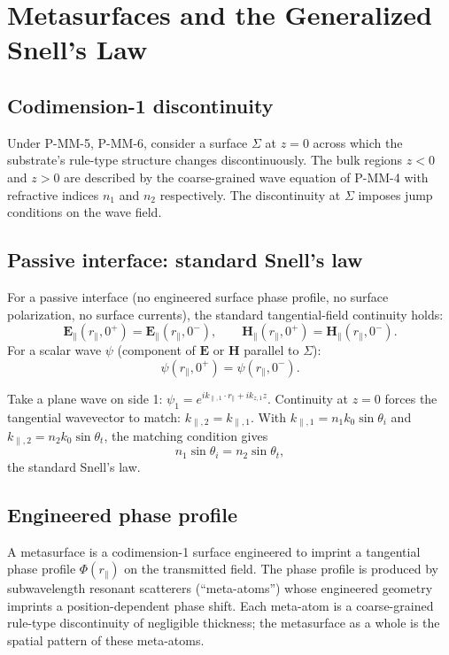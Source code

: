 \documentclass[11pt,a4paper]{article}
\begin{document}
\section{Metasurfaces and the Generalized Snell's Law}

\subsection{Codimension-1 discontinuity}

Under P-MM-5, P-MM-6, consider a surface $\Sigma$ at $z = 0$ across which the substrate's rule-type structure changes discontinuously. The bulk regions $z < 0$ and $z > 0$ are described by the coarse-grained wave equation of P-MM-4 with refractive indices $n_1$ and $n_2$ respectively. The discontinuity at $\Sigma$ imposes jump conditions on the wave field.

\subsection{Passive interface: standard Snell's law}

For a passive interface (no engineered surface phase profile, no surface polarization, no surface currents), the standard tangential-field continuity holds:
\[
\mathbf{E}_\parallel(r_\parallel, 0^+) = \mathbf{E}_\parallel(r_\parallel, 0^-), \qquad \mathbf{H}_\parallel(r_\parallel, 0^+) = \mathbf{H}_\parallel(r_\parallel, 0^-).
\]
For a scalar wave $\psi$ (component of $\mathbf{E}$ or $\mathbf{H}$ parallel to $\Sigma$):
\[
\psi(r_\parallel, 0^+) = \psi(r_\parallel, 0^-).
\]

Take a plane wave on side 1: $\psi_1 = e^{i k_{\parallel,1}\cdot r_\parallel + i k_{z,1} z}$. Continuity at $z = 0$ forces the tangential wavevector to match: $k_{\parallel,2} = k_{\parallel,1}$. With $k_{\parallel,1} = n_1 k_0 \sin\theta_i$ and $k_{\parallel,2} = n_2 k_0 \sin\theta_t$, the matching condition gives
\[
n_1 \sin\theta_i = n_2 \sin\theta_t,
\]
the standard Snell's law.

\subsection{Engineered phase profile}

A metasurface is a codimension-1 surface engineered to imprint a tangential phase profile $\Phi(r_\parallel)$ on the transmitted field. The phase profile is produced by subwavelength resonant scatterers (``meta-atoms'') whose engineered geometry imprints a position-dependent phase shift. Each meta-atom is a coarse-grained rule-type discontinuity of negligible thickness; the metasurface as a whole is the spatial pattern of these meta-atoms.
\end{document}

